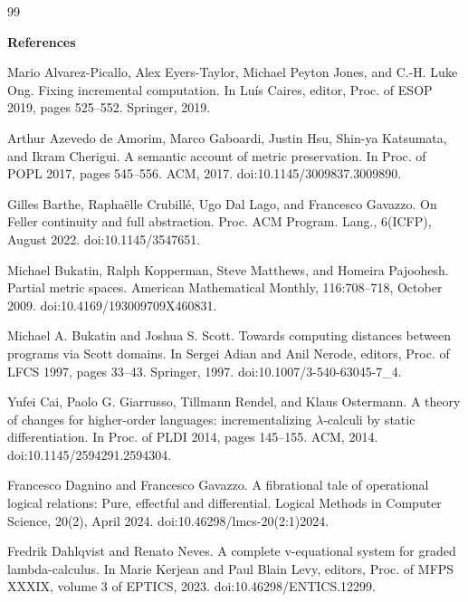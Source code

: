 \documentclass[10pt,a4paper]{amsart}
\begin{document}
\begin{thebibliography}{99}

 
\par\medskip\noindent\textbf{References}\par
  
\par\noindent  [1]  Mario Alvarez-Picallo, Alex Eyers-Taylor, Michael Peyton Jones, and C.-H. Luke Ong.  Fixing incremental computation.  In Luís Caires, editor, Proc. of ESOP 2019, pages 525–552. Springer, 2019.  
 
\par\noindent  [2]  Arthur Azevedo de Amorim, Marco Gaboardi, Justin Hsu, Shin-ya Katsumata, and Ikram Cherigui.  A semantic account of metric preservation.  In Proc. of POPL 2017, pages 545–556. ACM, 2017.  doi:10.1145/3009837.3009890.  
 
\par\noindent  [3]  Gilles Barthe, Raphaëlle Crubillé, Ugo Dal Lago, and Francesco Gavazzo.  On Feller continuity and full abstraction.  Proc. ACM Program. Lang., 6(ICFP), August 2022.  doi:10.1145/3547651.  
 
\par\noindent  [4]  Michael Bukatin, Ralph Kopperman, Steve Matthews, and Homeira Pajoohesh.  Partial metric spaces.  American Mathematical Monthly, 116:708–718, October 2009.  doi:10.4169/193009709X460831.  
 
\par\noindent  [5]  Michael A. Bukatin and Joshua S. Scott.  Towards computing distances between programs via Scott domains.  In Sergei Adian and Anil Nerode, editors, Proc. of LFCS 1997, pages 33–43. Springer, 1997.  doi:10.1007/3-540-63045-7\_4.  
 
\par\noindent  [6]  Yufei Cai, Paolo G. Giarrusso, Tillmann Rendel, and Klaus Ostermann.  A theory of changes for higher-order languages: incrementalizing $\lambda$-calculi by static differentiation.  In Proc. of PLDI 2014, pages 145–155. ACM, 2014.  doi:10.1145/2594291.2594304.  
 
\par\noindent  [7]  Francesco Dagnino and Francesco Gavazzo.  A fibrational tale of operational logical relations: Pure, effectful and differential.  Logical Methods in Computer Science, 20(2), April 2024.  doi:10.46298/lmcs-20(2:1)2024.  
 
\par\noindent  [8]  Fredrik Dahlqvist and Renato Neves.  A complete v-equational system for graded lambda-calculus.  In Marie Kerjean and Paul Blain Levy, editors, Proc. of MFPS XXXIX, volume 3 of EPTICS, 2023.  doi:10.46298/ENTICS.12299.  
 

\end{thebibliography}
\end{document}
